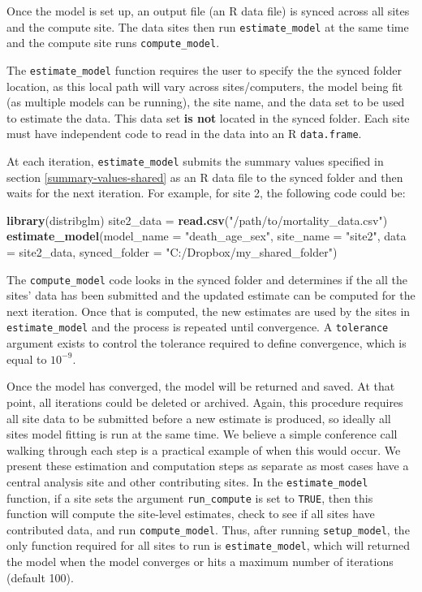 \documentclass[]{elsarticle} %
\newenvironment{Shaded}{\begin{snugshade}}{\end{snugshade}}
\newcommand{\DataTypeTok}[1]{\textcolor[rgb]{0.13,0.29,0.53}{#1}}
\newcommand{\KeywordTok}[1]{\textcolor[rgb]{0.13,0.29,0.53}{\textbf{#1}}}
\newcommand{\NormalTok}[1]{#1}
\newcommand{\StringTok}[1]{\textcolor[rgb]{0.31,0.60,0.02}{#1}}
\begin{document}
Once the model is set up, an output file (an R data file) is synced across all sites and the compute site. The data sites then run \texttt{estimate\_model} at the same time and the compute site runs \texttt{compute\_model}.

The \texttt{estimate\_model} function requires the user to specify the the synced folder location, as this local path will vary across sites/computers, the model being fit (as multiple models can be running), the site name, and the data set to be used to estimate the data. This data set \textbf{is not} located in the synced folder. Each site must have independent code to read in the data into an R \texttt{data.frame}.

At each iteration, \texttt{estimate\_model} submits the summary values specified in section \ref{summary-values-shared} as an R data file to the synced folder and then waits for the next iteration. For example, for site 2, the following code could be:

\begin{Shaded}
\begin{Highlighting}[]
\KeywordTok{library}\NormalTok{(distribglm)}
\NormalTok{site2\_data =}\StringTok{ }\KeywordTok{read.csv}\NormalTok{(}\StringTok{"/path/to/mortality\_data.csv"}\NormalTok{)}
\KeywordTok{estimate\_model}\NormalTok{(}\DataTypeTok{model\_name =} \StringTok{"death\_age\_sex"}\NormalTok{, }
               \DataTypeTok{site\_name =} \StringTok{"site2"}\NormalTok{, }
               \DataTypeTok{data =}\NormalTok{ site2\_data,}
               \DataTypeTok{synced\_folder =} \StringTok{"C:/Dropbox/my\_shared\_folder"}\NormalTok{)}
\end{Highlighting}
\end{Shaded}

The \texttt{compute\_model} code looks in the synced folder and determines if the all the sites' data has been submitted and the updated estimate can be computed for the next iteration. Once that is computed, the new estimates are used by the sites in \texttt{estimate\_model} and the process is repeated until convergence. A \texttt{tolerance} argument exists to control the tolerance required to define convergence, which is equal to \(10^{-9}\).

Once the model has converged, the model will be returned and saved. At that point, all iterations could be deleted or archived. Again, this procedure requires all site data to be submitted before a new estimate is produced, so ideally all sites model fitting is run at the same time. We believe a simple conference call walking through each step is a practical example of when this would occur. We present these estimation and computation steps as separate as most cases have a central analysis site and other contributing sites. In the \texttt{estimate\_model} function, if a site sets the argument \texttt{run\_compute} is set to \texttt{TRUE}, then this function will compute the site-level estimates, check to see if all sites have contributed data, and run \texttt{compute\_model}. Thus, after running \texttt{setup\_model}, the only function required for all sites to run is \texttt{estimate\_model}, which will returned the model when the model converges or hits a maximum number of iterations (default 100).
\end{document}
